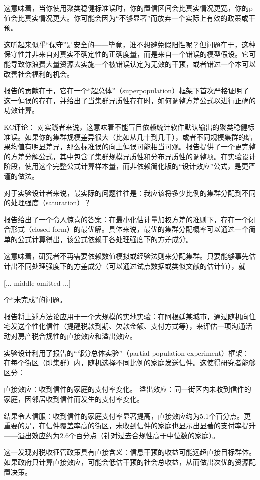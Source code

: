 \documentclass[11pt]{ctexart}
\begin{document}
这意味着，当你使用聚类稳健标准误时，你的置信区间会比真实情况更宽，你的p值会比真实情况更大。你可能会因为“不够显著”而放弃一个实际上有效的政策或干预。

这听起来似乎“保守”是安全的——毕竟，谁不想避免假阳性呢？但问题在于，这种保守性并非来自对真实不确定性的正确度量，而是来自一个错误的模型假设。它可能导致你浪费大量资源去实施一个被错误认定为无效的干预，或者错过一个本可以改善社会福利的机会。

报告的贡献在于，它在一个“超总体”（superpopulation）框架下首次严格证明了这一偏误的存在，并给出了当集群异质性存在时，如何调整方差公式以进行正确的功效计算。

KC评论： 对实践者来说，这意味着不能盲目依赖统计软件默认输出的聚类稳健标准误。如果你的集群规模差异很大（比如从几十到几千），或者不同规模集群的结果均值有明显差异，那么标准误的向上偏误可能相当可观。报告提供了一个更完整的方差分解公式，其中包含了集群规模异质性和分布异质性的调整项。在实验设计阶段，使用这个完整公式计算样本量，而非依赖简化版的“设计效应”公式，是更严谨的做法。

对于实验设计者来说，最实际的问题往往是：我应该将多少比例的集群分配到不同的处理强度（saturation）？

报告给出了一个令人惊喜的答案：在最小化估计量加权方差的准则下，存在一个闭合形式（closed-form）的最优解。具体来说，最优的集群分配概率可以通过一个简单的公式计算得出，该公式依赖于各处理强度下的方差成分。

这意味着，研究者不再需要依赖数值模拟或经验法则来分配集群。只要能够事先估计出不同处理强度下的方差成分（可以通过试点数据或类似文献的估计值），就

[... middle omitted ...]

个“未完成”的问题。

报告将上述方法论应用于一个大规模的实地实验：在阿根廷某城市，通过随机向住宅发送个性化信件（提醒税款到期、欠款金额、支付方式等），来评估一项沟通活动对房产税合规性的直接效应和溢出效应。

实验设计利用了报告的“部分总体实验”（partial population experiment）框架：在每个街区（即集群）内，随机选择不同比例的家庭发送信件。这使得研究者能够区分：

直接效应：收到信件的家庭的支付率变化。 溢出效应：同一街区内未收到信件的家庭，因邻居收到信件而发生的支付率变化。

结果令人信服：收到信件的家庭支付率显著提高，直接效应约为5.1个百分点。更重要的是，在信件覆盖率高的街区，未收到信件的家庭也显示出显著的支付率提升——溢出效应约为2.6个百分点（针对过去合规性高于中位数的家庭）。

这一发现对税收征管政策具有直接含义：信息干预的收益可能远超直接目标群体。如果政府只计算直接效应，可能会低估干预的社会总收益，从而做出次优的资源配置决策。
\end{document}
